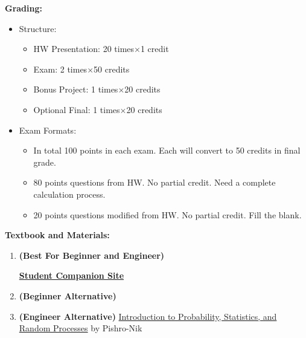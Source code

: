 \documentclass{article}
\begin{document}
\textbf{Grading:} {
    \begin{itemize}
        \item Structure: {
            \begin{itemize}
                \item HW Presentation: 20 times$\times$1 credit
                \item Exam: 2 times$\times$50 credits
                \item Bonus Project: 1 times$\times$20 credits
                \item Optional Final: 1 times$\times$20 credits
            \end{itemize}
        }
        \item Exam Formats: {
            \begin{itemize}
                \item In total 100 points in each exam. Each will convert to 50 credits in final grade.
                \item 80 points questions from HW. No partial credit. Need a complete calculation process.
                \item 20 points questions modified from HW. No partial credit. Fill the blank.
            \end{itemize}
        }
    \end{itemize}
}

\textbf{Textbook and Materials:} {
    \begin{enumerate}
        \item \textbf{(Best For Beginner and Engineer)} \label{book:Yates_Goodman_2015}

        \href{https://bcs.wiley.com/he-bcs/Books?action=index&itemId=1118324560&bcsId=8677}{\textbf{Student Companion Site}}
        \item \textbf{(Beginner Alternative)} 
        \item \textbf{(Engineer Alternative)} \href{https://www.probabilitycourse.com/}{Introduction to Probability, Statistics, and Random Processes} by Pishro-Nik
    \end{enumerate}
}
\end{document}
